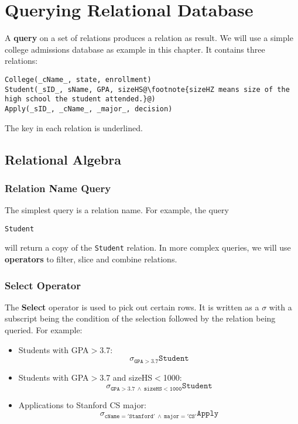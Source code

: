 \ifx\PREAMBLE\undefined


\fi
\chapter{Querying Relational Database}
A \textbf{query} on a set of relations produces a relation as result. We will use a simple college admissions database as example in this chapter. It contains three relations:
\begin{lstlisting}[escapechar=@]
College(_cName_, state, enrollment)
Student(_sID_, sName, GPA, sizeHS@\footnote{sizeHZ means size of the high school the student attended.}@)
Apply(_sID_, _cName_, _major_, decision)
\end{lstlisting}
The key in each relation is underlined.
\section{Relational Algebra}
\subsection{Relation Name Query}
The simplest query is a relation name. For example, the query
\begin{center}
\texttt{Student}
\end{center}
will return a copy of the \texttt{Student} relation. In more complex queries, we will use \textbf{operators} to filter, slice and combine relations.
\subsection{Select Operator}
The \textbf{Select} operator is used to pick out certain rows. It is written as a $\sigma$ with a subscript being the condition of the selection followed by the relation being queried. For example:
\begin{itemize}
\item Students with GPA$>$3.7: $$\mathtt{\sigma_{GPA>3.7}Student}$$
\item Students with GPA$>$3.7 and sizeHS$<$1000: $$\mathtt{\sigma_{GPA>3.7\:\land\: sizeHS<1000}Student}$$
\item Applications to Stanford CS major: $$\mathtt{\sigma_{cName='Stanford'\:\land\: major='CS'}Apply}$$
\end{itemize}
